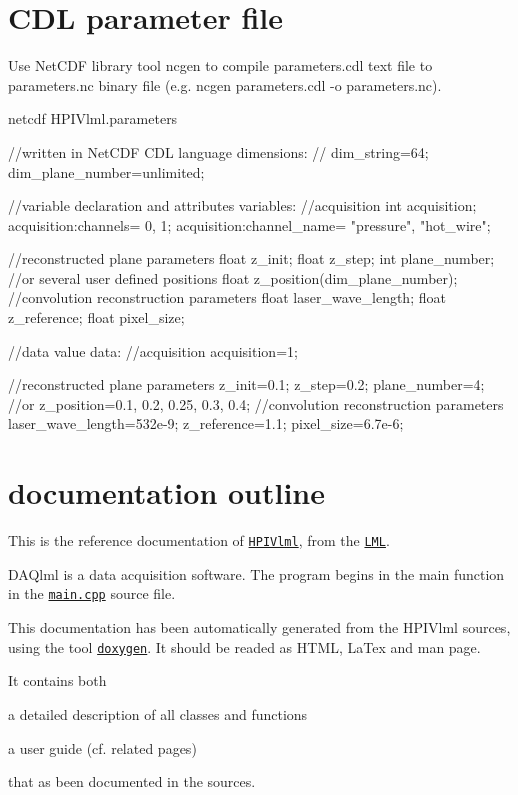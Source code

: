 \begin{DoxyVerbInclude}
\end{DoxyVerbInclude}
\hypertarget{index_sectionParameterFile}{}\section{CDL parameter file}\label{index_sectionParameterFile}
Use NetCDF library tool {\ttfamily ncgen} to compile {\ttfamily parameters.cdl} text file to {\ttfamily parameters.nc} binary file (e.g. {\ttfamily ncgen} {\ttfamily parameters.cdl} {\ttfamily -\/o} {\ttfamily parameters.nc}). 
\begin{DoxyVerbInclude}
netcdf HPIVlml.parameters {//written in NetCDF CDL language
dimensions:
//  dim_string=64;
  dim_plane_number=unlimited;

//variable declaration and attributes
variables:
//acquisition
  int acquisition;
    acquisition:channels= 0, 1;
    acquisition:channel_name= "pressure", "hot_wire";

//reconstructed plane parameters
  float z_init;
  float z_step;
  int   plane_number;
  //or several user defined positions
  float z_position(dim_plane_number);
//convolution reconstruction parameters
  float laser_wave_length;
  float z_reference;
  float pixel_size;

//data value
data:
//acquisition
  acquisition=1;

//reconstructed plane parameters
  z_init=0.1;
  z_step=0.2;
  plane_number=4;
  //or
  z_position=0.1, 0.2, 0.25, 0.3, 0.4;
//convolution reconstruction parameters
  laser_wave_length=532e-9;
  z_reference=1.1;
  pixel_size=6.7e-6;
}

\end{DoxyVerbInclude}
\hypertarget{index_sectionDAQlmlDocumentation}{}\section{documentation outline}\label{index_sectionDAQlmlDocumentation}
This is the reference documentation of \href{http://www.meol.cnrs.fr/}{\tt HPIVlml}, from the \href{http://www.univ-lille1.fr/lml/}{\tt LML}.\par
\par
 DAQlml is a data acquisition software. The program begins in the main function in the \href{main1_8cpp.html}{\tt main.cpp} source file.\par
\par
 This documentation has been automatically generated from the HPIVlml sources, using the tool \href{http://www.doxygen.org}{\tt doxygen}. It should be readed as HTML, LaTex and man page.\par
 It contains both \begin{DoxyItemize}
\item a detailed description of all classes and functions \item a user guide (cf. related pages)\end{DoxyItemize}
that as been documented in the sources.

